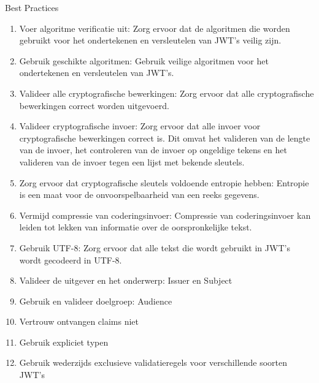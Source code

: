   Best Practices
  \begin{enumerate}[label=\textbf{-}]
    \item Voer algoritme verificatie uit: Zorg ervoor dat de algoritmen die worden gebruikt voor het ondertekenen en versleutelen van JWT's veilig zijn.
    \item Gebruik geschikte algoritmen: Gebruik veilige algoritmen voor het ondertekenen en versleutelen van JWT's.
    \item Valideer alle cryptografische bewerkingen: Zorg ervoor dat alle cryptografische bewerkingen correct worden uitgevoerd.
    \item Valideer cryptografische invoer: Zorg ervoor dat alle invoer voor cryptografische bewerkingen correct is. Dit omvat het valideren van de lengte van de invoer, het controleren van de invoer op ongeldige tekens en het valideren van de invoer tegen een lijst met bekende sleutels.
    \item Zorg ervoor dat cryptografische sleutels voldoende entropie hebben: Entropie is een maat voor de onvoorspelbaarheid van een reeks gegevens.
    \item Vermijd compressie van coderingsinvoer: Compressie van coderingsinvoer kan leiden tot lekken van informatie over de oorspronkelijke tekst.
    \item Gebruik UTF-8: Zorg ervoor dat alle tekst die wordt gebruikt in JWT's wordt gecodeerd in UTF-8.
    \item Valideer de uitgever en het onderwerp: Issuer en Subject
    \item Gebruik en valideer doelgroep: Audience
    \item Vertrouw ontvangen claims niet
    \item Gebruik expliciet typen
    \item Gebruik wederzijds exclusieve validatieregels voor verschillende soorten JWT's
  \end{enumerate}
  \autocite{Sheffer2020}


